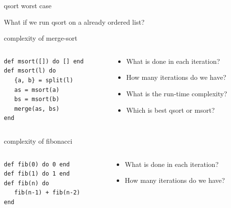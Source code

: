 \begin{frame}{qsort worst case}

What if we run qsort on a already ordered list?

\end{frame}


\begin{frame}[fragile]{complexity of merge-sort}

\begin{columns}
   \begin{column}{.6\linewidth}
    \begin{verbatim}
def msort([]) do [] end
def msort(l) do
   {a, b} = split(l)
   as = msort(a)
   bs = msort(b)
   merge(as, bs)
end
   \end{verbatim}
   \end{column}
   \begin{column}{.4\linewidth}
    \begin{itemize}
      \pause \item What is done in each iteration?
      \pause \item How many iterations do we have?       
      \pause \item What is the run-time complexity?       
      \pause \item Which is best qsort or msort?       
    \end{itemize}
   \end{column}
\end{columns}

\end{frame}

\begin{frame}[fragile]{complexity of fibonacci}

\begin{columns}
   \begin{column}{.6\linewidth}
    \begin{verbatim}
def fib(0) do 0 end
def fib(1) do 1 end
def fib(n) do 
   fib(n-1) + fib(n-2)
end
    \end{verbatim}
   \end{column}
   \begin{column}{.4\linewidth}
    \begin{itemize}
      \pause \item What is done in each iteration?
      \pause \item How many iterations do we have?       
    \end{itemize}
   \end{column}
\end{columns}

\end{frame}

